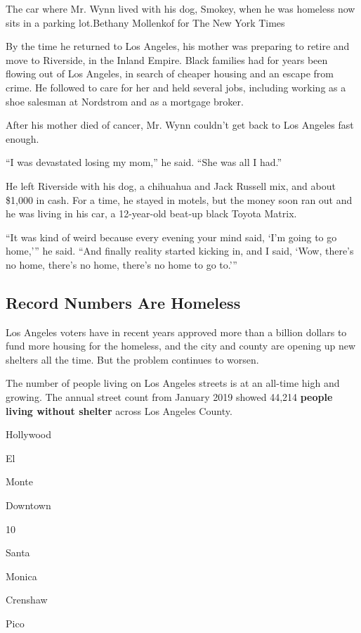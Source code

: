 The car where Mr. Wynn lived with his dog, Smokey, when he was homeless
now sits in a parking lot.Bethany Mollenkof for The New York Times

By the time he returned to Los Angeles, his mother was preparing to
retire and move to Riverside, in the Inland Empire. Black families had
for years been flowing out of Los Angeles, in search of cheaper housing
and an escape from crime. He followed to care for her and held several
jobs, including working as a shoe salesman at Nordstrom and as a
mortgage broker.

After his mother died of cancer, Mr. Wynn couldn't get back to Los
Angeles fast enough.

``I was devastated losing my mom,'' he said. ``She was all I had.''

He left Riverside with his dog, a chihuahua and Jack Russell mix, and
about \$1,000 in cash. For a time, he stayed in motels, but the money
soon ran out and he was living in his car, a 12-year-old beat-up black
Toyota Matrix.

``It was kind of weird because every evening your mind said, `I'm going
to go home,''' he said. ``And finally reality started kicking in, and I
said, `Wow, there's no home, there's no home, there's no home to go
to.'''

\hypertarget{record-numbers-are-homeless}{%
\subsection{Record Numbers Are
Homeless}\label{record-numbers-are-homeless}}

Los Angeles voters have in recent years approved more than a billion
dollars to fund more housing for the homeless, and the city and county
are opening up new shelters all the time. But the problem continues to
worsen.

The number of people living on Los Angeles streets is at an all-time
high and growing. The annual street count from January 2019 showed
44,214 \textbf{people living without shelter} across Los Angeles County.

Hollywood

El

Monte

Downtown

10

Santa

Monica

Crenshaw

Pico


